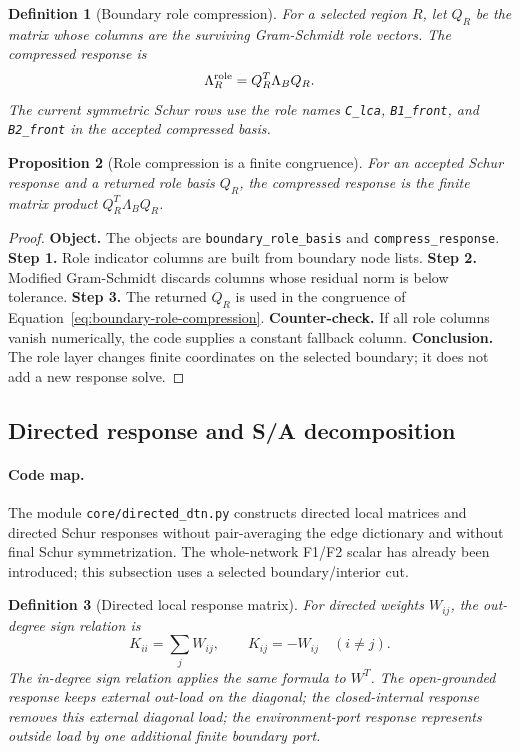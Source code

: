 \documentclass[11pt]{article}
\newtheorem{definition}{Definition}[section]
\newtheorem{proposition}[definition]{Proposition}
\theoremstyle{remark}
\newcommand{\code}[1]{\texttt{#1}}
\numberwithin{equation}{section}
\begin{document}
\begin{definition}[Boundary role compression]
For a selected region \(R\), let \(Q_R\) be the matrix whose columns are the surviving Gram-Schmidt role vectors. The compressed response is
\begin{equation}
  \Lambda_R^{\rm role}=Q_R^T\Lambda_BQ_R.
  \label{eq:boundary-role-compression}
\end{equation}
The current symmetric Schur rows use the role names \code{C\_lca}, \code{B1\_front}, and \code{B2\_front} in the accepted compressed basis.
\end{definition}

\begin{proposition}[Role compression is a finite congruence]
For an accepted Schur response and a returned role basis \(Q_R\), the compressed response is the finite matrix product \(Q_R^T\Lambda_BQ_R\).
\end{proposition}
\begin{proof}
\textbf{Object.} The objects are \code{boundary\_\allowbreak{}role\_\allowbreak{}basis} and \code{compress\_\allowbreak{}response}. \textbf{Step 1.} Role indicator columns are built from boundary node lists. \textbf{Step 2.} Modified Gram-Schmidt discards columns whose residual norm is below tolerance. \textbf{Step 3.} The returned \(Q_R\) is used in the congruence of Equation~\eqref{eq:boundary-role-compression}. \textbf{Counter-check.} If all role columns vanish numerically, the code supplies a constant fallback column. \textbf{Conclusion.} The role layer changes finite coordinates on the selected boundary; it does not add a new response solve.
\end{proof}

\subsection{Directed response and S/A decomposition}
\paragraph{Code map.} The module \code{core/directed\_\allowbreak{}dtn.py} constructs directed local matrices and directed Schur responses without pair-averaging the edge dictionary and without final Schur symmetrization. The whole-network F1/F2 scalar has already been introduced; this subsection uses a selected boundary/interior cut.

\begin{definition}[Directed local response matrix]
For directed weights \(W_{ij}\), the out-degree sign relation is
\begin{equation}
  K_{ii}=\sum_j W_{ij},\qquad K_{ij}=-W_{ij}\quad(i\ne j).
  \label{eq:directed-local-response-matrix}
\end{equation}
The in-degree sign relation applies the same formula to \(W^T\). The open-grounded response keeps external out-load on the diagonal; the closed-internal response removes this external diagonal load; the environment-port response represents outside load by one additional finite boundary port.
\end{definition}
\end{document}
